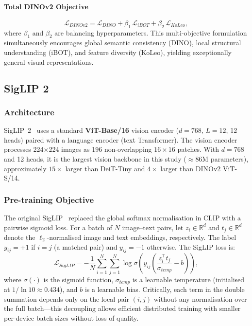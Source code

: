 \documentclass[journal]{IEEEtran}
\begin{document}
\paragraph{Total DINOv2 Objective}
\begin{equation}
    \mathcal{L}_{DINOv2} = \mathcal{L}_{DINO} + \beta_1\,\mathcal{L}_{iBOT}
    + \beta_2\,\mathcal{L}_{KoLeo},
    \label{eq:dinov2_loss}
\end{equation}
where $\beta_1$ and $\beta_2$ are balancing hyperparameters. This multi-objective formulation
simultaneously encourages global semantic consistency (DINO), local structural understanding
(iBOT), and feature diversity (KoLeo), yielding exceptionally general visual representations.

\subsection{SigLIP 2}
\label{subsec:siglip2}

\subsubsection{Architecture}
SigLIP~2~\cite{tschannen2025siglip2} uses a standard \textbf{ViT-Base/16} vision encoder
($d=768$, $L=12$, 12 heads) paired with a language encoder (text Transformer). The vision
encoder processes 224$\times$224 images as 196 non-overlapping $16\times16$ patches. With
$d=768$ and 12 heads, it is the largest vision backbone in this study ($\approx$86M parameters),
approximately $15\times$ larger than DeiT-Tiny and $4\times$ larger than DINOv2 ViT-S/14.

\subsubsection{Pre-training Objective}
The original SigLIP~\cite{zhai2023siglip} replaced the global softmax normalisation in CLIP
with a pairwise sigmoid loss. For a batch of $N$ image–text pairs, let $z_i \in \mathbb{R}^d$
and $t_j \in \mathbb{R}^d$ denote the $\ell_2$-normalised image and text embeddings,
respectively. The label $y_{ij} = +1$ if $i = j$ (a matched pair) and $y_{ij} = -1$ otherwise.
The SigLIP loss is:
\begin{equation}
    \mathcal{L}_{SigLIP} = -\frac{1}{N}\sum_{i=1}^{N}\sum_{j=1}^{N}
    \log \sigma\!\left(y_{ij}\!\left(\frac{z_i^\top t_j}{\sigma_{temp}} - b\right)\right),
    \label{eq:siglip_loss}
\end{equation}
where $\sigma(\cdot)$ is the sigmoid function, $\sigma_{temp}$ is a learnable temperature
(initialised at $1/\ln 10 \approx 0.434$), and $b$ is a learnable bias. Critically, each
term in the double summation depends only on the local pair $(i,j)$ without any normalisation
over the full batch—this decoupling allows efficient distributed training with smaller per-device
batch sizes without loss of quality.
\end{document}
